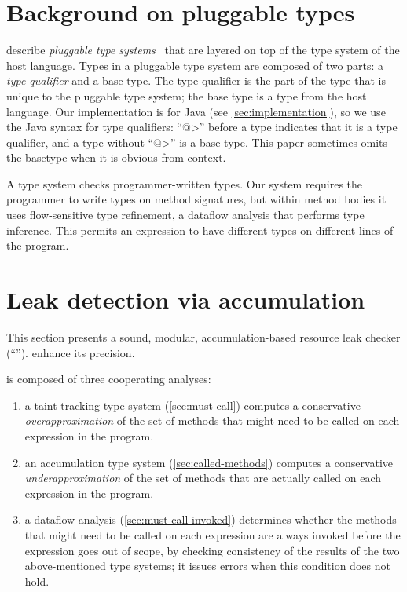 \section{Background on pluggable types}
\label{sec:background}

 describe
\emph{pluggable type systems}~\cite{FosterFFA99}
that are layered on top of the type system of the host
language.  Types in a pluggable type system are composed of two parts:
a \emph{type qualifier} and a base type. The type qualifier is the
part of the type that is unique to the pluggable type system; the base
type is a type from the host language. Our implementation is for Java
(see \cref{sec:implementation}), so we use the Java syntax for type
qualifiers: ``\<@>'' before a type indicates that it is a type
qualifier, and a type without ``\<@>'' is a base type.
This paper sometimes omits the basetype when it is obvious from context.

A type system checks programmer-written types.  Our system requires the
programmer to write types on method signatures, but within method bodies it
uses flow-sensitive type refinement, a dataflow analysis that performs type
inference.  This permits an expression to have different types on different
lines of the program.



\section{Leak detection via accumulation}
\label{sec:base-type-systems}

This section presents a sound, modular, accumulation-based
resource leak checker (``\tool'').
enhance its precision.

\Tool is composed of three cooperating analyses:
\begin{enumerate}
\item a taint tracking type system (\cref{sec:must-call}) computes a conservative
  \emph{overapproximation} of the set of methods that might need to be called
  on each expression in the program.
\item an accumulation type system (\cref{sec:called-methods}) computes
  a conservative \emph{underapproximation} of the set of methods that are
  actually called on each expression in the program.
\item a dataflow analysis (\cref{sec:must-call-invoked}) determines whether the
  methods that might need to be called on each expression are always invoked before the
  expression goes out of scope, by checking consistency of the results of the two
  above-mentioned type systems; it issues errors when this condition does not hold.
\end{enumerate}

